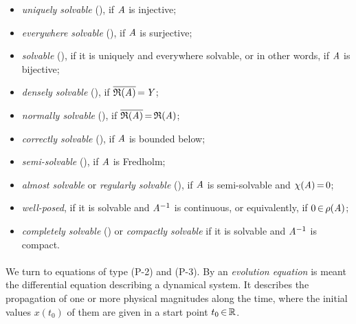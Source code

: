 \documentclass[11pt,twoside]{article}
\begin{document}
\begin{itemize}[leftmargin=9mm]
\item[(a)]
\textit{uniquely solvable} (\cite{Kr}),
if $\mathit{A}$ is injective;

\item[(b)]
\textit{everywhere solvable} (\cite{Kr}),
if $\mathit{A}$ is surjective;

\item[(c)]
\textit{solvable} (\cite{Br1}),
if it is uniquely and everywhere solvable,
or in other words, if $\mathit{A}$ is bijective;

\item[(d)]
\textit{densely solvable} (\cite{Kr}),
if $\overline{\mathfrak{R}(\mathit{A})} {\,=\,} \mathit{Y}$;

\item[(e)]
\textit{normally solvable} (\cite{Kr}),
if $\overline{\mathfrak{R}(\mathit{A})} {\,=\,} \mathfrak{R}(\mathit{A})$;

\item[(f)]
\textit{correctly solvable} (\cite{Kr}),
if $\mathit{A}$ is bounded below;

\item[(g)]
\textit{semi-solvable} (\cite{Br1}), if $\mathit{A}$ is Fredholm;

\item[(h)]
\textit{almost solvable} or \textit{regularly solvable} (\cite{Br1}),
if $\mathit{A}$ is semi-solvable and $\chi(\mathit{A}) {\,=\,} 0$;

\item[(i)]
\textit{well-posed},
if it is solvable and $\mathit{A}^{-1}$ is continuous,
or equivalently,
if $0 {\,\in\,} \rho(\mathit{A})$;

\item[(j)]
\textit{completely solvable} (\cite{Br1}) or \textit{compactly solvable}
if it is solvable and $\mathit{A}^{-1}$ is compact.
\end{itemize}

\paragraph{} %
We turn to equations of type (P-2) and (P-3).
By an \textit{evolution equation} is meant the differential equation
describing a dynamical system.
It describes the propagation of one or more physical magnitudes along the time,
where the initial values $x(t_0)$ of them are given
in a start point $t_0 {\,\in\,} {\mathbb{R}}$.
\end{document}
